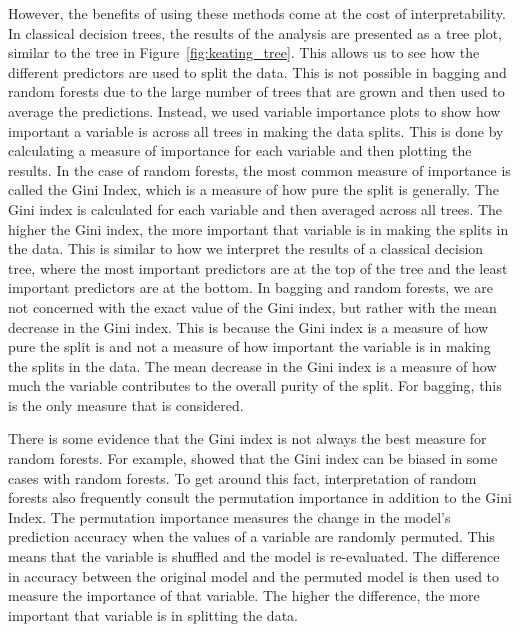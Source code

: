 However, the benefits of using these methods come at the cost of interpretability. In classical decision trees, the results of the analysis are presented as a tree plot, similar to the tree in Figure~\ref{fig:keating_tree}. This allows us to see how the different predictors are used to split the data. This is not possible in bagging and random forests due to the large number of trees that are grown and then used to average the predictions. Instead, we used variable importance plots to show how important a variable is across all trees in making the data splits. This is done by calculating a measure of importance for each variable and then plotting the results. In the case of random forests, the most common measure of importance is called the Gini Index, which is a measure of how pure the split is generally. The Gini index is calculated for each variable and then averaged across all trees. The higher the Gini index, the more important that variable is in making the splits in the data. This is similar to how we interpret the results of a classical decision tree, where the most important predictors are at the top of the tree and the least important predictors are at the bottom. In bagging and random forests, we are not concerned with the exact value of the Gini index, but rather with the mean decrease in the Gini index. This is because the Gini index is a measure of how pure the split is and not a measure of how important the variable is in making the splits in the data. The mean decrease in the Gini index is a measure of how much the variable contributes to the overall purity of the split. For bagging, this is the only measure that is considered. 

There is some evidence that the Gini index is not always the best measure for random forests. For example, \citet{stroblBiasRandomForest2007} showed that the Gini index can be biased in some cases with random forests. To get around this fact, interpretation of random forests also frequently consult the permutation importance in addition to the Gini Index. The permutation importance measures the change in the model's prediction accuracy when the values of a variable are randomly permuted. This means that the variable is shuffled and the model is re-evaluated. The difference in accuracy between the original model and the permuted model is then used to measure the importance of that variable. The higher the difference, the more important that variable is in splitting the data.

